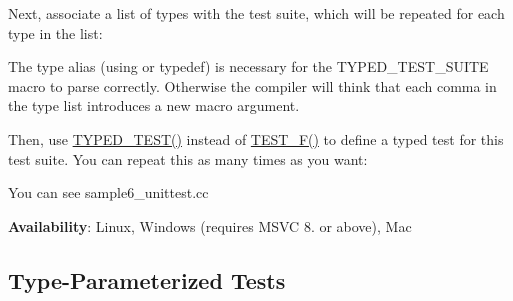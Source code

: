 Next, associate a list of types with the test suite, which will be repeated for each type in the list\+:


\begin{DoxyCode}{0}
\end{DoxyCode}


The type alias ({\ttfamily using} or {\ttfamily typedef}) is necessary for the {\ttfamily T\+Y\+P\+E\+D\+\_\+\+T\+E\+S\+T\+\_\+\+S\+U\+I\+TE} macro to parse correctly. Otherwise the compiler will think that each comma in the type list introduces a new macro argument.

Then, use {\ttfamily \mbox{\hyperlink{googletest-master_2googletest_2test_2googletest-list-tests-unittest___8cc_a83ec84c5fac9fdffa59a16e5d043bd66}{T\+Y\+P\+E\+D\+\_\+\+T\+E\+S\+T()}}} instead of {\ttfamily \mbox{\hyperlink{googletest-master_2googletest_2include_2gtest_2gtest_8h_a0ee66d464d1a06c20c1929cae09d8758}{T\+E\+S\+T\+\_\+\+F()}}} to define a typed test for this test suite. You can repeat this as many times as you want\+:


\begin{DoxyCode}{0}
\DoxyCodeLine{}
\DoxyCodeLine{}
\DoxyCodeLine{}
\DoxyCodeLine{\}}
\DoxyCodeLine{}
\end{DoxyCode}


You can see sample6\+\_\+unittest.\+cc

{\bfseries{Availability}}\+: Linux, Windows (requires M\+S\+VC 8. or above), Mac

\subsection*{Type-\/\+Parameterized Tests}

